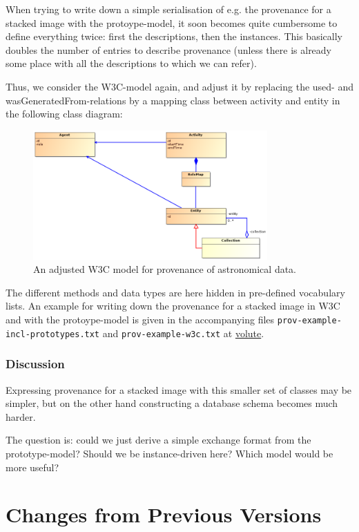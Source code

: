\documentclass[11pt,a4paper]{ivoa}
\begin{document}
When trying to write down a simple serialisation of e.g. the provenance for a stacked image with the protoype-model, it soon becomes quite cumbersome to define everything twice: first the descriptions, then the instances. This basically doubles the number of entries to describe provenance (unless there is already some place with all the descriptions to which we can refer).


Thus, we consider the W3C-model again, and adjust it by replacing the used- and wasGeneratedFrom-relations by a mapping class between activity and entity in the following class diagram:

\begin{figure}
\centering
\includegraphics[width=0.8\textwidth]{ProvDM-W3C-adjusted.png}
\caption{An adjusted W3C model for provenance of astronomical data.}
\label{fig:classes-w3c-adjusted}
\end{figure}


The different methods and data types are here hidden in pre-defined vocabulary lists. 
An example for writing down the provenance for a stacked image in W3C and with the protoype-model is given in the accompanying files 
\texttt{prov-example-incl-prototypes.txt} and 
\texttt{prov-example-w3c.txt} at \href{https://code.google.com/p/volute/source/browse/trunk/projects/dm/provenance/description/}{volute}.




\subsubsection{Discussion}

Expressing provenance for a stacked image with this smaller set of classes may be simpler, but on the other hand constructing a database schema becomes much harder. 

The question is: could we just derive a simple exchange format from the prototype-model? Should we be instance-driven here? Which model would be more useful?




\appendix
\section{Changes from Previous Versions}



\end{document}
